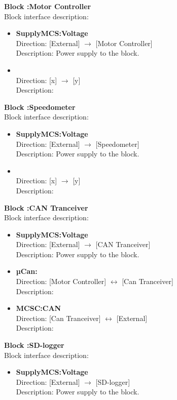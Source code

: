 \textbf{Block :Motor Controller}\\
Block interface description:
\begin{itemize}
	\item \textbf{SupplyMCS:Voltage}\\
	Direction: [External] $\rightarrow$ [Motor Controller]\\
	Description: Power supply to the block.
	\item \textbf{}\\
	Direction: [x] $\rightarrow$ [y]\\
	Description:
\end{itemize}

\textbf{Block :Speedometer}\\
Block interface description:
\begin{itemize}
	\item \textbf{SupplyMCS:Voltage}\\
	Direction: [External] $\rightarrow$ [Speedometer]\\
	Description: Power supply to the block.
	\item \textbf{}\\
	Direction: [x] $\rightarrow$ [y]\\
	Description:
\end{itemize}

\textbf{Block :CAN Tranceiver}\\
Block interface description:
\begin{itemize}
	\item \textbf{SupplyMCS:Voltage}\\
	Direction: [External] $\rightarrow$ [CAN Tranceiver]\\
	Description: Power supply to the block.
	\item \textbf{µCan:}\\
	Direction: [Motor Controller] $\leftrightarrow$ [Can Tranceiver]\\
	Description:
	\item \textbf{MCSC:CAN}\\
	Direction: [Can Tranceiver] $\leftrightarrow$ [External]\\
	Description:
\end{itemize}

\textbf{Block :SD-logger}\\
Block interface description:
\begin{itemize}
	\item \textbf{SupplyMCS:Voltage}\\
	Direction: [External] $\rightarrow$ [SD-logger]\\
	Description: Power supply to the block.
\end{itemize}